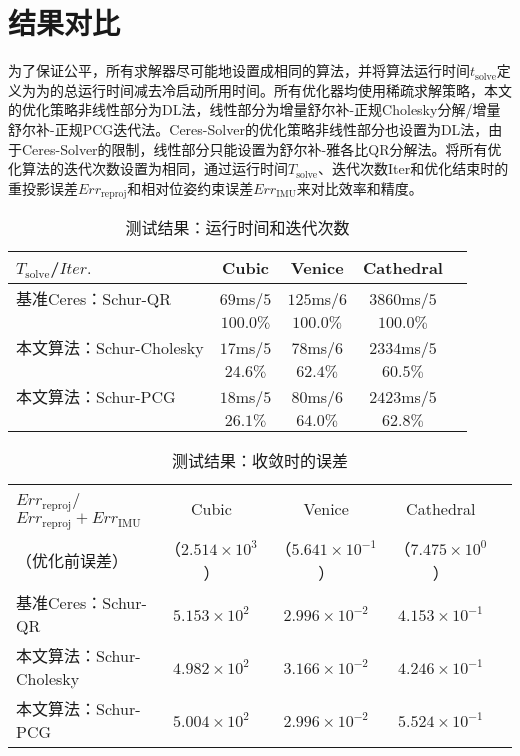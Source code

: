 \section{结果对比}

为了保证公平，所有求解器尽可能地设置成相同的算法，并将算法运行时间$t_{\text{solve}}$定义为为的总运行时间减去冷启动所用时间。所有优化器均使用稀疏求解策略，本文的优化策略非线性部分为DL法，线性部分为增量舒尔补-正规Cholesky分解/增量舒尔补-正规PCG迭代法。Ceres-Solver的优化策略非线性部分也设置为DL法，由于Ceres-Solver的限制，线性部分只能设置为舒尔补-雅各比QR分解法。将所有优化算法的迭代次数设置为相同，通过运行时间$T_{\text{solve}}$、迭代次数Iter和优化结束时的重投影误差$Err_{\text{reproj}}$和相对位姿约束误差$Err_{\text{IMU}}$来对比效率和精度。

{
\linespread{1}
\begin{table}[htb!]
\caption{测试结果：运行时间和迭代次数}
\label{tab:time}
\centering
\begin{tabular}[b]{l|cccc}
    \toprule
    $T_{\text{solve}}$/$Iter.$  &      Cubic &      Venice &    Cathedral \\ \midrule
    基准Ceres：Schur-QR         & $69$ms/$5$ & $125$ms/$6$ & $3860$ms/$5$ \\
                                &  $100.0\%$ &   $100.0\%$ &    $100.0\%$ \\ \midrule
    本文算法：Schur-Cholesky    & $17$ms/$5$ &  $78$ms/$6$ & $2334$ms/$5$ \\
                                &   $24.6\%$ &    $62.4\%$ &     $60.5\%$ \\ \midrule
    本文算法：Schur-PCG         & $18$ms/$5$ &  $80$ms/$6$ & $2423$ms/$5$ \\
                                &   $26.1\%$ &    $64.0\%$ &     $62.8\%$ \\
    \bottomrule
\end{tabular}
\end{table}
}

{
\linespread{1}
\begin{table}[htb!]
\caption{测试结果：收敛时的误差}
\label{tab:energy}
\centering
\begin{tabular}[b]{l|cccc}
    \toprule $Err_{\text{reproj}}$/
    $Err_{\text{reproj}}+Err_{\text{IMU}}$ &                 Cubic &                   Venice &               Cathedral \\
    （优化前误差）                         & （$2.514\times10^3$） & （$5.641\times10^{-1}$） & （$7.475\times10^{0}$） \\ \midrule
    基准Ceres：Schur-QR                    &     $5.153\times10^2$ &     $2.996\times10^{-2}$ &    $4.153\times10^{-1}$ \\
    本文算法：Schur-Cholesky               &     $4.982\times10^2$ &     $3.166\times10^{-2}$ &    $4.246\times10^{-1}$ \\
    本文算法：Schur-PCG                    &     $5.004\times10^2$ &     $2.996\times10^{-2}$ &    $5.524\times10^{-1}$ \\
    \bottomrule
\end{tabular}
\end{table}
}

